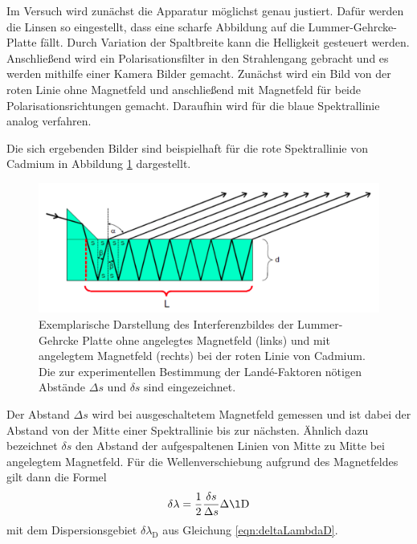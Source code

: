 Im Versuch wird zunächst die Apparatur möglichst genau justiert. Dafür werden
die Linsen so eingestellt, dass eine scharfe Abbildung auf die Lummer-Gehrcke-Platte
fällt. Durch Variation der Spaltbreite kann die Helligkeit gesteuert werden.
Anschließend wird ein Polarisationsfilter in den Strahlengang gebracht und es werden
mithilfe einer Kamera Bilder gemacht. Zunächst wird ein Bild von der roten Linie ohne
Magnetfeld und anschließend mit Magnetfeld für beide Polarisationsrichtungen gemacht.
Daraufhin wird für die blaue Spektrallinie analog verfahren.

Die sich ergebenden Bilder sind beispielhaft für die rote Spektrallinie von Cadmium in Abbildung \ref{fig:abstaende} dargestellt.

\begin{figure}
  \centering
  \includegraphics[width=\textwidth]{data/lummer.png}
  \caption{Exemplarische Darstellung des Interferenzbildes der Lummer-Gehrcke Platte ohne angelegtes Magnetfeld (links) und mit angelegtem Magnetfeld (rechts) bei der roten Linie von Cadmium. Die zur experimentellen Bestimmung der Landé-Faktoren nötigen Abstände $\Delta s$ und $\delta s$ sind eingezeichnet. \cite{Versuchsanleitung}}
  \label{fig:abstaende}
\end{figure}

Der Abstand $\Delta s$ wird bei ausgeschaltetem Magnetfeld gemessen und ist dabei der Abstand von der Mitte einer Spektrallinie bis zur nächsten. Ähnlich dazu bezeichnet $\delta s$ den Abstand der aufgespaltenen Linien von Mitte zu Mitte bei angelegtem Magnetfeld.
Für die Wellenverschiebung aufgrund des Magnetfeldes gilt dann die Formel
\begin{equation}
  \delta \lambda = \frac{1}{2} \frac{\delta s}{\Delta s} \Delta \l\text{D}
  \label{eqn:deltaLambda}
\end{equation}
mit dem Dispersionsgebiet $\delta \lambda_\text{D}$ aus Gleichung \eqref{eqn:deltaLambdaD}.
